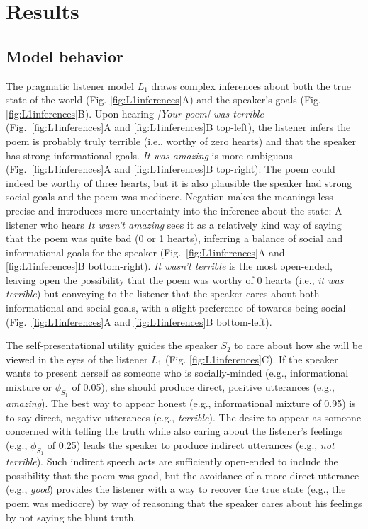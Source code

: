 \documentclass[9pt,twocolumn,twoside,lineno]{main_class_file}
\begin{document}
\section*{Results}

\subsection*{Model behavior}

The pragmatic listener model \(L_1\) draws complex inferences about both the true state of the world (Fig. \ref{fig:L1inferences}A) and the speaker's goals (Fig. \ref{fig:L1inferences}B).
Upon hearing \emph{{[}Your poem{]} was terrible} (Fig.~\ref{fig:L1inferences}A and \ref{fig:L1inferences}B top-left), the listener infers the poem is probably truly terrible (i.e., worthy of zero hearts) and that the speaker has strong informational goals.
\emph{It was amazing} is more ambiguous (Fig.~\ref{fig:L1inferences}A and \ref{fig:L1inferences}B top-right): The poem could indeed be worthy of three hearts, but it is also plausible the speaker had strong social goals and the poem was mediocre. 
Negation makes the meanings less precise and introduces more uncertainty into the inference about the state: A listener who hears \emph{It wasn't amazing} sees it as a relatively kind way of saying that the poem was quite bad (0 or 1 hearts), inferring a balance of social and informational goals for the speaker (Fig.~\ref{fig:L1inferences}A and \ref{fig:L1inferences}B bottom-right).
\emph{It wasn't terrible} is the most open-ended, leaving open the possibility that the poem was worthy of 0 hearts (i.e., \emph{it was terrible}) but conveying to the listener that the speaker cares about both informational and social goals, with a slight preference of towards being social (Fig.~\ref{fig:L1inferences}A and \ref{fig:L1inferences}B bottom-left). 

The self-presentational utility guides the speaker \(S_2\) to care about how she will be viewed in the eyes of the listener \(L_1\) (Fig. \ref{fig:L1inferences}C).
If the speaker wants to present herself as someone who is socially-minded (e.g., informational mixture or $\phi_{S_1}$ of 0.05), she should produce direct, positive utterances (e.g., \emph{amazing}).
The best way to appear honest (e.g., informational mixture of 0.95) is to say direct, negative utterances (e.g., \emph{terrible}).
The desire to appear as someone concerned with telling the truth while also caring about the listener's feelings (e.g., $\phi_{S_1}$ of 0.25) leads the speaker to produce indirect utterances (e.g., \emph{not terrible}).
Such indirect speech acts are sufficiently open-ended to include the
possibility that the poem was good, but the avoidance of a more direct utterance (e.g., \emph{good}) provides the listener with a way to recover the true state (e.g., the poem was mediocre) by way of reasoning that the speaker cares about his feelings by not saying the blunt truth.
\end{document}
